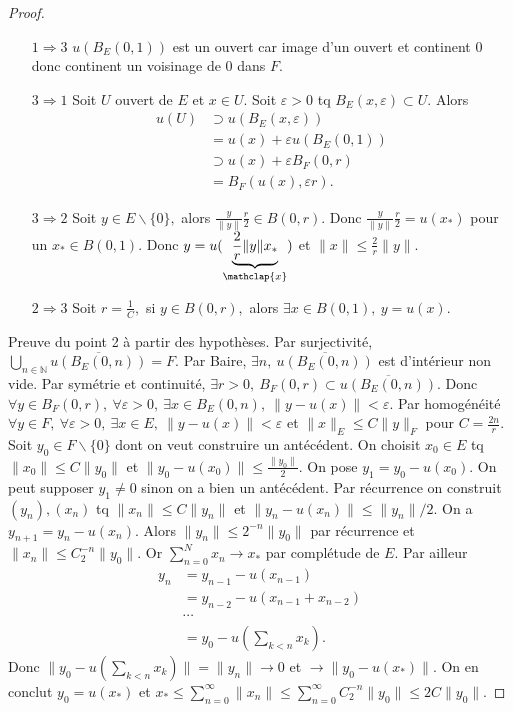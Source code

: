 \begin{proof}\par\noindent
\begin{itemize}
    \item[$1\Rightarrow 3$] $u(B_E(0,1))$ est un ouvert car image d'un ouvert et continent 0 donc continent un voisinage de 0 dans $F$.
    \item[$3\Rightarrow 1$] Soit $U$ ouvert de $E$ et $x\in U.$ Soit $\varepsilon >0$ tq $B_E(x,\varepsilon )\subset U.$ Alors 
    \begin{align*}
        u(U) &\supset u(B_E(x,\varepsilon ))\\
        &=u(x)+\varepsilon u(B_E(0,1))\\
        &\supset u(x)+\varepsilon B_F(0,r)\\
        &=B_F(u(x),\varepsilon r)
    .\end{align*}
    \item[$3\Rightarrow 2$] Soit $y\in E\backslash \{0\} ,$ alors $\frac{y}{\|y\|}\frac{r}{2}\in B(0,r).$ Donc $\frac{y}{\|y\|}\frac{r}{2}=u(x_*)$ pour un $x_*\in B(0,1).$ Donc $y=u(\underbrace{\frac{2}{r}\|y\|x_*}_{\mathclap{x}})$ et $\|x\|\le \frac{2}{r}\|y\|.$
    \item[$2\Rightarrow 3$] Soit $r=\frac{1}{C},$ si $y\in B(0,r),$ alors $\exists x\in B(0,1),\ y=u(x).$
\end{itemize}
Preuve du point 2 à partir des hypothèses. Par surjectivité,
${\bigcup\limits_{n\in \mathbb{N}} \overline{u(B_E(0,n))}=F.}$ Par Baire, $\exists n,\ \overline{u(B_E(0,n))}$ est d'intérieur non vide. Par symétrie et continuité, $\exists r>0,\ B_F(0,r)\subset \overline{u(B_E(0,n))}.$ Donc $\forall y\in B_F(0,r),\ \forall \varepsilon >0,\ \exists x\in B_E(0,n),\ \|y-u(x)\|<\varepsilon .$ Par homogénéité $\forall y\in  F,\ \forall \varepsilon >0,\ \exists x\in E,\ \|y-u(x)\|<\varepsilon $ et $\|x\|_E\le C\|y\|_F$ pour $C=\frac{2n}{r}$.\\
Soit $y_0\in F\backslash \{0\} $ dont on veut construire un antécédent. On choisit $x_0\in E$ tq $\|x_0\|\le C\|y_0\|$ et $\|y_0-u(x_0)\|\le \frac{\|y_0\|}{2}.$ On pose $y_1=y_0-u(x_0).$ On peut supposer $y_1\neq 0$ sinon on a bien un antécédent. Par récurrence on construit $(y_n),(x_n)$ tq $\|x_n\|\le C\|y_n\|$ et $\|y_n-u(x_n)\|\le \|y_n\|/2.$ On a $y_{n+1}=y_n-u(x_n).$ Alors $\|y_n\|\le 2^{-n}\|y_0\|$ par récurrence et $\|x_n\|\le C_2^{-n}\|y_0\|.$ Or $\sum\limits_{n=0}^{N} x_n\to x_*$ par complétude de $E.$ Par ailleur
\begin{align*}
    y_n&=y_{n-1}-u(x_{n-1})\\
       &=y_{n-2}-u(x_{n-1}+x_{n-2})\\
       &\cdots\\
       &=y_0-u(\sum\limits_{k<n}^{} x_k).
\end{align*}
Donc $\|y_0-u(\sum\limits_{k<n}^{} x_k)\|=\|y_n\|\to 0$ et $\to \|y_0-u(x_*)\|$. On en conclut $y_0=u(x_*)$ et $x_*\le \sum\limits_{n=0}^{\infty} \|x_n\|\le \sum\limits_{n=0}^{\infty} C_2^{-n}\|y_0\|\le 2C\|y_0\|.$
\end{proof}

